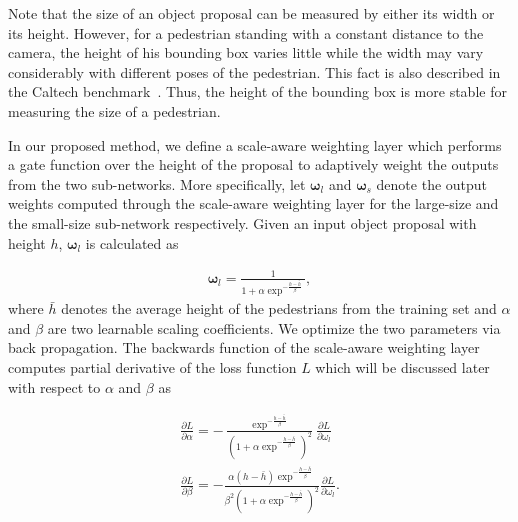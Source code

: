 \documentclass[journal]{IEEEtran}
\begin{document}
Note that the size of an object proposal can be measured by either its width or its height. However, for a pedestrian standing with a constant distance to the camera, the height of his bounding box varies little while the width may vary considerably with different poses of the pedestrian. This fact is also described in the Caltech benchmark~\cite{dollar2012pedestrian}. Thus, the height of the bounding box is more stable for measuring the size of a pedestrian. 

In our proposed method, we define a scale-aware weighting layer which performs a gate function over the height of the proposal to adaptively weight the outputs from the two sub-networks. More specifically, let $\boldsymbol{\omega}_l$ and $\boldsymbol{\omega}_s$ denote the output weights computed through the scale-aware weighting layer for the large-size and the small-size sub-network respectively. Given an input object proposal with height $h$, $\boldsymbol{\omega}_l$ is calculated as

\begin{equation}
	\begin{aligned}
		\boldsymbol{\omega}_l = \frac{1}{1 + \alpha \exp^{-\frac{h - \bar{h}}{\beta}}},
		\label{eq:weights_l}
	\end{aligned}
\end{equation}
where $\bar{h}$ denotes the average height of the pedestrians from the training set and $\alpha$ and $\beta$ are two learnable scaling coefficients. We optimize the two parameters via back propagation. The backwards function of the scale-aware weighting layer  computes partial derivative of the loss function $L$ which will be discussed later with respect to $\alpha$ and $\beta$ as

\begin{equation}
	\begin{aligned}
		\frac{\partial L}{\partial \alpha} = - \frac{\exp^{-\frac{h - \bar{h}}{\beta}}}{(1 + \alpha \exp^{-\frac{h - \bar{h}}{\beta}})^{2}} \frac{\partial L}{\partial {\omega}_l} \\
		\frac{\partial L}{\partial \beta} = - \frac{\alpha (h - \bar{h}) \exp^{-\frac{h - \bar{h}}{\beta}}}{\beta^{2} (1 + \alpha \exp^{-\frac{h - \bar{h}}{\beta}})^{2}} \frac{\partial L}{\partial {\omega}_l}.
		\label{eq:derivative_alpha}
	\end{aligned}
\end{equation}

\end{document}
